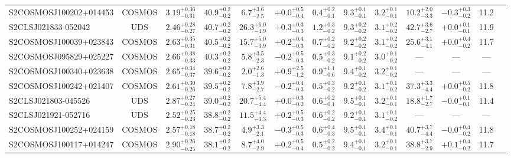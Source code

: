 \documentclass[a4paper, fleqn, usenatbib]{mnras}
\begin{document}
\begin{landscape}
\begin{table}
\begin{tabular}{l c c c c c c c c c c c c}
        S2COSMOSJ100202+014453 & COSMOS & $3.19^{+0.36}_{-0.31}$ & $40.9^{+0.2}_{-0.2}$ & $6.7^{+3.6}_{-2.5}$ & $+0.0^{+0.5}_{-0.4}$ & $0.4^{+0.2}_{-0.1}$ & $9.3^{+0.1}_{-0.1}$ & $3.2^{+0.1}_{-0.1}$ & $10.2^{+2.0}_{-3.3}$ & $-0.3^{+0.3}_{-0.2}$ & 11.2\\
        S2CLSJ021833-052042 & UDS & $2.46^{+0.28}_{-0.27}$ & $40.7^{+0.2}_{-0.2}$ & $26.3^{+6.0}_{-4.9}$ & $+0.3^{+0.3}_{-0.3}$ & $1.2^{+0.3}_{-0.2}$ & $9.3^{+0.2}_{-0.2}$ & $3.1^{+0.2}_{-0.2}$ & $42.7^{+3.6}_{-2.7}$ & $+0.0^{+0.1}_{-0.1}$ & 11.9\\
        S2COSMOSJ100039+023843 & COSMOS & $2.63^{+0.35}_{-0.31}$ & $40.5^{+0.2}_{-0.2}$ & $15.7^{+5.0}_{-3.9}$ & $+0.2^{+0.4}_{-0.3}$ & $0.7^{+0.2}_{-0.2}$ & $9.2^{+0.2}_{-0.2}$ & $3.1^{+0.2}_{-0.2}$ & $25.6^{+3.1}_{-4.1}$ & $+0.0^{+0.4}_{-0.2}$ & 11.7\\
        S2COSMOSJ095829+025227 & COSMOS & $2.66^{+0.38}_{-0.33}$ & $40.3^{+0.2}_{-0.2}$ & $5.8^{+3.5}_{-2.3}$ & $-0.2^{+0.5}_{-0.3}$ & $0.5^{+0.3}_{-0.2}$ & $9.1^{+0.2}_{-0.2}$ & $3.0^{+0.1}_{-0.2}$ & --- & --- & ---\\
        S2COSMOSJ100340+023638 & COSMOS & $2.65^{+0.34}_{-0.37}$ & $39.6^{+0.2}_{-0.2}$ & $2.0^{+2.6}_{-1.3}$ & $+0.9^{+2.5}_{-1.2}$ & $0.9^{+1.1}_{-0.6}$ & $9.4^{+0.1}_{-0.2}$ & $3.2^{+0.1}_{-0.2}$ & --- & --- & ---\\
        S2COSMOSJ100242+021407 & COSMOS & $2.61^{+0.30}_{-0.26}$ & $39.5^{+0.2}_{-0.2}$ & $7.8^{+3.9}_{-2.7}$ & $-0.2^{+0.4}_{-0.3}$ & $0.5^{+0.3}_{-0.2}$ & $9.2^{+0.1}_{-0.2}$ & $3.1^{+0.1}_{-0.2}$ & $37.3^{+3.3}_{-4.4}$ & $+0.0^{+0.5}_{-0.2}$ & 11.8\\
        S2CLSJ021803-045526 & UDS & $2.87^{+0.27}_{-0.24}$ & $39.0^{+0.2}_{-0.2}$ & $20.7^{+5.4}_{-4.4}$ & $+0.0^{+0.3}_{-0.2}$ & $0.6^{+0.2}_{-0.1}$ & $9.5^{+0.1}_{-0.1}$ & $3.2^{+0.1}_{-0.1}$ & $18.8^{+1.7}_{-2.7}$ & $-0.0^{+0.1}_{-0.1}$ & 11.4\\
        S2CLSJ021921-052716 & UDS & $2.52^{+0.25}_{-0.23}$ & $38.8^{+0.2}_{-0.2}$ & $11.5^{+4.4}_{-3.3}$ & $+0.2^{+0.5}_{-0.3}$ & $0.6^{+0.2}_{-0.2}$ & $9.2^{+0.1}_{-0.1}$ & $3.1^{+0.1}_{-0.2}$ & --- & --- & ---\\
        S2COSMOSJ100252+024159 & COSMOS & $2.57^{+0.18}_{-0.18}$ & $38.7^{+0.2}_{-0.2}$ & $4.9^{+3.3}_{-2.1}$ & $-0.3^{+0.5}_{-0.3}$ & $0.6^{+0.4}_{-0.3}$ & $9.5^{+0.1}_{-0.1}$ & $3.4^{+0.1}_{-0.1}$ & $40.7^{+3.7}_{-4.4}$ & $-0.0^{+0.4}_{-0.2}$ & 11.8\\
        S2COSMOSJ100117+014247 & COSMOS & $2.90^{+0.26}_{-0.25}$ & $38.1^{+0.2}_{-0.2}$ & $8.7^{+4.0}_{-2.9}$ & $+0.2^{+0.5}_{-0.4}$ & $0.5^{+0.2}_{-0.2}$ & $9.4^{+0.1}_{-0.1}$ & $3.2^{+0.1}_{-0.1}$ & $38.8^{+3.7}_{-2.9}$ & $+0.1^{+0.4}_{-0.2}$ & 11.7\\

\end{tabular}
\end{table}
\end{landscape}
\end{document}
